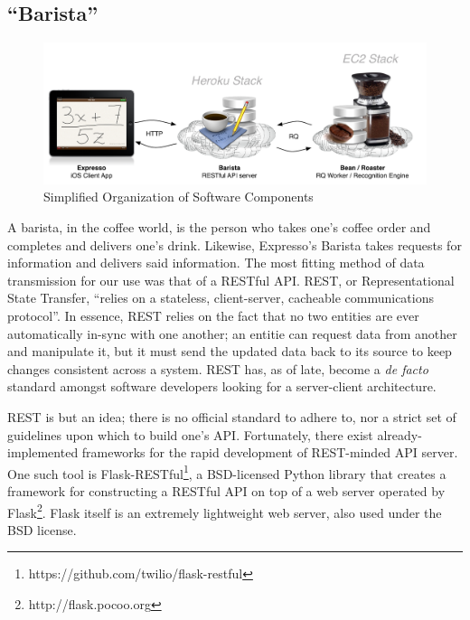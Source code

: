 \documentclass{acm_proc_article-sp}
\begin{document}
\subsection{``Barista''}

\begin{figure}
\centering
\includegraphics[width=1.0\textwidth]{final_chart.pdf}
\caption{Simplified Organization of Software Components}
\label{fig:final_chart}
\end{figure}

A barista, in the coffee world, is the person who takes one's coffee order and completes and delivers one's drink. Likewise, Expresso's Barista takes requests for information and delivers said information. The most fitting method of data transmission for our use was that of a RESTful API. REST, or Representational State Transfer, ``relies on a stateless, client-server, cacheable communications protocol''\cite{elkstein_rest_2008}. In essence, REST relies on the fact that no two entities are ever automatically in-sync with one another; an entitie can request data from another and manipulate it, but it must send the updated data back to its source to keep changes consistent across a system. REST has, as of late, become a \emph{de facto} standard amongst software developers looking for a server-client architecture. 

REST is but an idea; there is no official standard to adhere to, nor a strict set of guidelines upon which to build one's API. Fortunately, there exist already-implemented frameworks for the rapid development of REST-minded API server. One such tool is Flask-RESTful\footnote{https://github.com/twilio/flask-restful}, a BSD-licensed Python library that creates a framework for constructing a RESTful API on top of a web server operated by Flask\footnote{http://flask.pocoo.org}. Flask itself is an extremely lightweight web server, also used under the BSD license.
\end{document}
